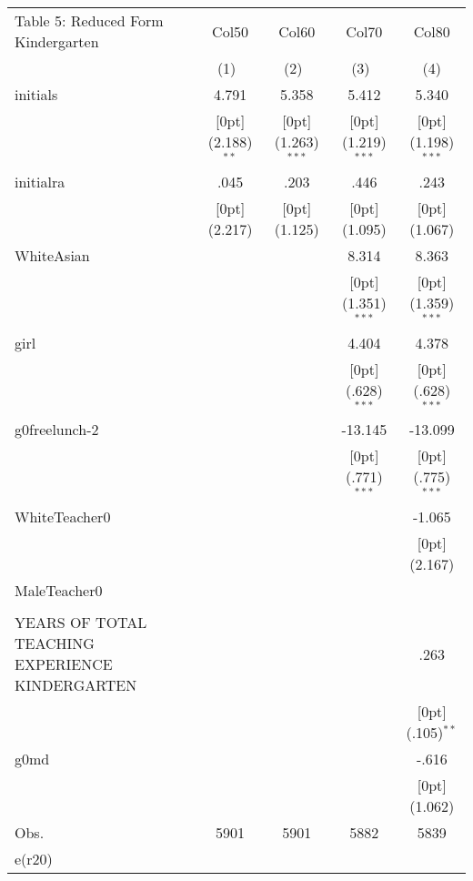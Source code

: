 \documentclass[a4paper,11pt]{article}
\begin{document}
\begin{table}
	\small
\begin{tabular*}{\textwidth}{@{\extracolsep{\fill}}lcccc}		
		Table 5: Reduced Form Kindergarten & \multicolumn{1}{c}{Col50} &	\multicolumn{1}{c}{Col60} &	\multicolumn{1}{c}{Col70} &	\multicolumn{1}{c}{Col80} \\
		\cline{2-5}				
		& \multicolumn{1}{c}{(1)\mbox{\ }} &	\multicolumn{1}{c}{(2)\mbox{\ }} &	\multicolumn{1}{c}{(3)\mbox{\ }} &	\multicolumn{1}{c}{(4)} \\
		\hline				
		initials &	4.791 &	5.358 &	5.412 &	5.340 \\
		&	\raisebox{.7ex}[0pt]{\scriptsize (2.188)$^{**}$} &	\raisebox{.7ex}[0pt]{\scriptsize (1.263)$^{***}$} &	\raisebox{.7ex}[0pt]{\scriptsize (1.219)$^{***}$} &	\raisebox{.7ex}[0pt]{\scriptsize (1.198)$^{***}$} \\
		initialra &	.045 &	.203 &	.446 &	.243 \\
		&	\raisebox{.7ex}[0pt]{\scriptsize (2.217)} &	\raisebox{.7ex}[0pt]{\scriptsize (1.125)} &	\raisebox{.7ex}[0pt]{\scriptsize (1.095)} &	\raisebox{.7ex}[0pt]{\scriptsize (1.067)} \\
		WhiteAsian &	&	&	8.314 &	8.363 \\
		&	&	&	\raisebox{.7ex}[0pt]{\scriptsize (1.351)$^{***}$} &	\raisebox{.7ex}[0pt]{\scriptsize (1.359)$^{***}$} \\
		girl &	&	&	4.404 &	4.378 \\
		&	&	&	\raisebox{.7ex}[0pt]{\scriptsize (.628)$^{***}$} &	\raisebox{.7ex}[0pt]{\scriptsize (.628)$^{***}$} \\
		g0freelunch-2 &	&	&	-13.145 &	-13.099 \\
		&	&	&	\raisebox{.7ex}[0pt]{\scriptsize (.771)$^{***}$} &	\raisebox{.7ex}[0pt]{\scriptsize (.775)$^{***}$} \\
		WhiteTeacher0 &	&	&	&	-1.065 \\
		&	&	&	&	\raisebox{.7ex}[0pt]{\scriptsize (2.167)} \\
		MaleTeacher0 &	&	&	&	\\
		&	&	&	&	\\
		YEARS OF TOTAL TEACHING EXPERIENCE KINDERGARTEN &	&	&	&	.263 \\
		&	&	&	&	\raisebox{.7ex}[0pt]{\scriptsize (.105)$^{**}$} \\
		g0md &	&	&	&	-.616 \\
		&	&	&	&	\raisebox{.7ex}[0pt]{\scriptsize (1.062)} \\
		Obs. &	5901 &	5901 &	5882 &	5839 \\
		e(r20) &	&	&	&	\\
		\hline\hline				
	\end{tabular*}		
	

\end{table}	
\end{document}
